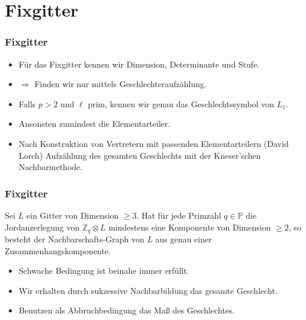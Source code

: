 \documentclass{beamer}
\newcommand{\Z}{\mathbb{Z}}
\renewcommand{\P}{\mathbb{P}}
\begin{document}
\section{Fixgitter}
\frame{\tableofcontents[currentsection]}
\begin{frame}[plain]
	\frametitle{Fixgitter}
	\begin{itemize}
		\item Für das Fixgitter kennen wir Dimension, Determinante und Stufe.
		\pause
	 	\item $\Rightarrow$ Finden wir nur mittels Geschlechteraufzählung.
		\pause 
		\item Falls $p > 2$ und $\ell$ prim, kennen wir genau das Geschlechtssymbol von $L_1$.
		\pause
		\item Ansonsten zumindest die Elementarteiler.
		\pause 
		\item Nach Konstruktion von Vertretern mit passenden Elementarteilern (David Lorch) Aufzählung des gesamten Geschlechts mit der Kneser'schen Nachbarmethode.
	\end{itemize}
\end{frame}

\begin{frame}[plain]
	\frametitle{Fixgitter}
	\begin{Satz}
		Sei $L$ ein Gitter von Dimension $\geq 3$. Hat für jede Primzahl $q \in \P$ die Jordanzerlegung von $\Z_q \otimes L$ mindestens eine Komponente von Dimension $\geq 2$, so besteht der Nachbarschafts-Graph von $L$ aus genau einer Zusammenhangskomponente.
	\end{Satz}
	\pause
	\begin{itemize}
		\item Schwache Bedingung ist beinahe immer erfüllt.
		\item Wir erhalten durch sukzessive Nachbarbildung das gesamte Geschlecht.
		\item Benutzen als Abbruchbedingung das Maß des Geschlechtes.
	\end{itemize}
\end{frame}
\end{document}
